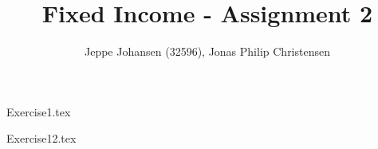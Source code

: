 \documentclass[12pt,a4paper]{article}
\author{Jeppe Johansen (32596), Jonas Philip Christensen}
\title{Fixed Income - Assignment 2}
\begin{document}
\maketitle

{Exercise1.tex}

{Exercise12.tex}
\end{document}
